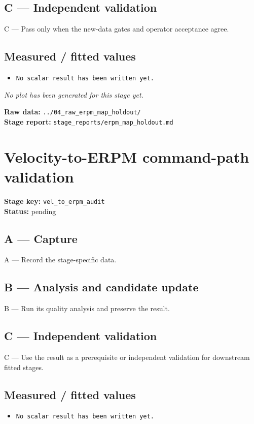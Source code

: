 \documentclass[11pt,a4paper]{article}
\begin{document}
\subsection*{C --- Independent validation}
C — Pass only when the new-data gates and operator acceptance agree.

\subsection*{Measured / fitted values}
\begin{itemize}\setlength\itemsep{0pt}
\item \texttt{No scalar result has been written yet.}
\end{itemize}

\textit{No plot has been generated for this stage yet.}

\vfill
\textbf{Raw data:} \texttt{../04\_raw\_erpm\_map\_holdout/}\\
\textbf{Stage report:} \texttt{stage\_reports/erpm\_map\_holdout.md}
\clearpage
\small
\section*{Velocity-to-ERPM command-path validation}
\textbf{Stage key:} \texttt{vel\_to\_erpm\_audit}\\
\textbf{Status:} pending\\

\subsection*{A --- Capture}
A — Record the stage-specific data.

\subsection*{B --- Analysis and candidate update}
B — Run its quality analysis and preserve the result.

\subsection*{C --- Independent validation}
C — Use the result as a prerequisite or independent validation for downstream fitted stages.

\subsection*{Measured / fitted values}
\begin{itemize}\setlength\itemsep{0pt}
\item \texttt{No scalar result has been written yet.}
\end{itemize}
\end{document}
